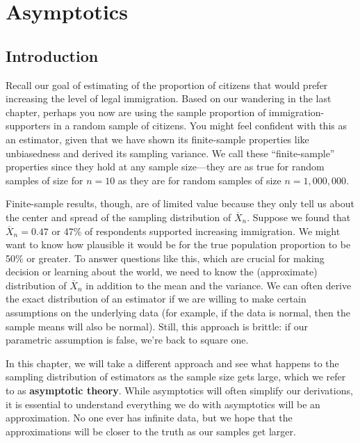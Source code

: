 \documentclass[
  letterpaper,
  DIV=11,
  numbers=noendperiod]{scrreprt}
\newcommand{\Xbar}{\overline{X}}
\theoremstyle{definition}
\theoremstyle{definition}
\theoremstyle{plain}
\theoremstyle{remark}
\begin{document}
\hypertarget{sec-asymptotics}{%
\chapter{Asymptotics}\label{sec-asymptotics}}

\hypertarget{introduction-3}{%
\section{Introduction}\label{introduction-3}}

Recall our goal of estimating of the proportion of citizens that would
prefer increasing the level of legal immigration. Based on our wandering
in the last chapter, perhaps you now are using the sample proportion of
immigration-supporters in a random sample of citizens. You might feel
confident with this as an estimator, given that we have shown its
finite-sample properties like unbiasedness and derived its sampling
variance. We call these ``finite-sample'' properties since they hold at
any sample size---they are as true for random samples of size for
\(n = 10\) as they are for random samples of size \(n = 1,000,000\).

Finite-sample results, though, are of limited value because they only
tell us about the center and spread of the sampling distribution of
\(\Xbar_n\). Suppose we found that \(\Xbar_n = 0.47\) or 47\% of
respondents supported increasing immigration. We might want to know how
plausible it would be for the true population proportion to be 50\% or
greater. To answer questions like this, which are crucial for making
decision or learning about the world, we need to know the (approximate)
distribution of \(\Xbar_n\) in addition to the mean and the variance. We
can often derive the exact distribution of an estimator if we are
willing to make certain assumptions on the underlying data (for example,
if the data is normal, then the sample means will also be normal).
Still, this approach is brittle: if our parametric assumption is false,
we're back to square one.

In this chapter, we will take a different approach and see what happens
to the sampling distribution of estimators as the sample size gets
large, which we refer to as \textbf{asymptotic theory}. While
asymptotics will often simplify our derivations, it is essential to
understand everything we do with asymptotics will be an approximation.
No one ever has infinite data, but we hope that the approximations will
be closer to the truth as our samples get larger.
\end{document}
